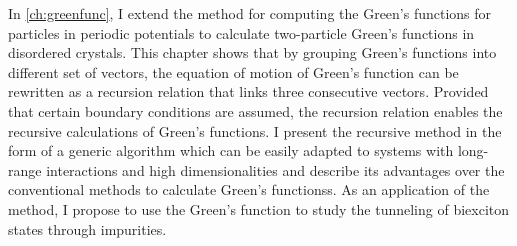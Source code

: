 In \autoref{ch:greenfunc}, I extend the method\cite{Berciu2010, Berciu2011, Berciu2012} for computing the Green's 
functions for particles in periodic potentials to calculate 
two-particle 
Green's functions in disordered crystals. 
This chapter shows that by grouping Green's functions into different set of vectors, the 
equation of motion of Green's function can be rewritten as a recursion relation that links three consecutive vectors. 
Provided that certain boundary conditions are assumed, the recursion relation enables the recursive calculations of Green's 
functions. I present the recursive method in the form of a generic algorithm which can be easily 
adapted to systems with long-range interactions and high dimensionalities and describe its advantages over the conventional methods to calculate Green's functionss. As an application of the method, I propose
to use the Green’s function to study the tunneling of biexciton states through
 impurities.


